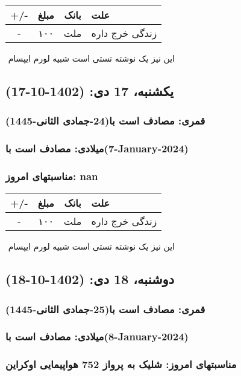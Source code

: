 \documentclass{article}
\newcommand{\rnote}[1]{\marginpar{\textcolor{color}{\StrSubstitute{\##1}{ }{\_}}}}
\newcommand{\myRow}[4]{
    #1 & #2 & #3 & #4 \\ \hline
}
\begin{document}
\begin{tabular}{ | c | c | c | p{5cm} |}
    \hline
    \myRow{ +/- }{مبلغ}{بانک}{علت}
    \myRow{-}{۱۰۰}{ملت}{زندگی خرج داره}
\end{tabular}
\newline
\newline

‌
\rnote{تست}
این نیز یک نوشته تستی است شبیه لورم ایپسام




\newpage
{}
\textcolor{color}{
\section{ یکشنبه، 17 دی: (1402-10-17) }
\subsubsection*{قمری: مصادف است با(24-جمادی الثانی-1445)} 
\subsubsection*{میلادی: مصادف است با(7-January-2024)}
\subsubsection*{مناسبتهای امروز: nan}
}


\begin{tabular}{ | c | c | c | p{5cm} |}
    \hline
    \myRow{ +/- }{مبلغ}{بانک}{علت}
    \myRow{-}{۱۰۰}{ملت}{زندگی خرج داره}
\end{tabular}
\newline
\newline

‌
\rnote{تست}
این نیز یک نوشته تستی است شبیه لورم ایپسام




\newpage
{}
\textcolor{color}{
\section{ دوشنبه، 18 دی: (1402-10-18) }
\subsubsection*{قمری: مصادف است با(25-جمادی الثانی-1445)} 
\subsubsection*{میلادی: مصادف است با(8-January-2024)}
\subsubsection*{مناسبتهای امروز: شلیک به پرواز 752 هواپیمایی اوکراین}
}
\end{document}
